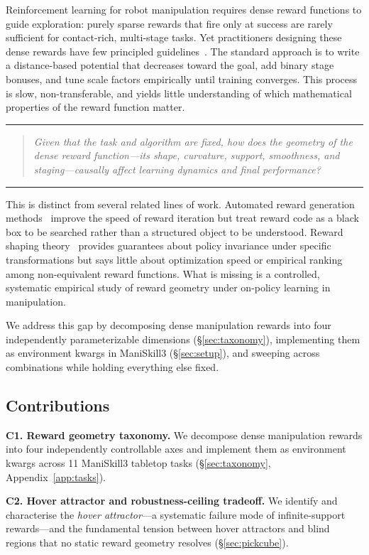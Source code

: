 \documentclass{article}
\newenvironment{keyinsight}{%
  \vspace{4pt}\noindent\rule{\linewidth}{0.5pt}\vspace{2pt}%
  \begin{quote}\small\itshape}%
 {\end{quote}\vspace{2pt}\noindent\rule{\linewidth}{0.5pt}\vspace{4pt}}
\begin{document}
Reinforcement learning for robot manipulation requires dense reward functions to guide
exploration: purely sparse rewards that fire only at success are rarely sufficient for
contact-rich, multi-stage tasks. Yet practitioners designing these dense rewards have
few principled guidelines~\citep{ibrahim2024comprehensive}. The standard approach is to write a distance-based potential
that decreases toward the goal, add binary stage bonuses, and tune scale factors
empirically until training converges. This process is slow, non-transferable, and yields
little understanding of which mathematical properties of the reward function matter.

\begin{keyinsight}
Given that the task and algorithm are fixed, how does the \emph{geometry} of
the dense reward function---its shape, curvature, support, smoothness, and
staging---causally affect learning dynamics and final performance?
\end{keyinsight}

This is distinct from several related lines of work. Automated reward generation
methods~\citep{ma2024eureka} improve the speed of reward iteration but treat reward code
as a black box to be searched rather than a structured object to be understood.
Reward shaping theory~\citep{ng1999shaping,devlin2012potential} provides guarantees
about policy invariance under specific transformations but says little about optimization
speed or empirical ranking among non-equivalent reward functions. What is missing is a
controlled, systematic empirical study of reward geometry under on-policy learning in
manipulation.

We address this gap by decomposing dense manipulation rewards into four independently
parameterizable dimensions (\S\ref{sec:taxonomy}), implementing them as environment
kwargs in ManiSkill3 (\S\ref{sec:setup}), and sweeping across combinations while
holding everything else fixed.

\subsection{Contributions}

\noindent\textbf{C1. Reward geometry taxonomy.}
We decompose dense manipulation rewards into four independently controllable axes
and implement them as environment kwargs across 11 ManiSkill3 tabletop tasks
(\S\ref{sec:taxonomy}, Appendix~\ref{app:tasks}).

\noindent\textbf{C2. Hover attractor and robustness-ceiling tradeoff.}
We identify and characterise the \emph{hover attractor}---a systematic failure
mode of infinite-support rewards---and the fundamental tension between hover
attractors and blind regions that no static reward geometry resolves
(\S\ref{sec:pickcube}).
\end{document}

